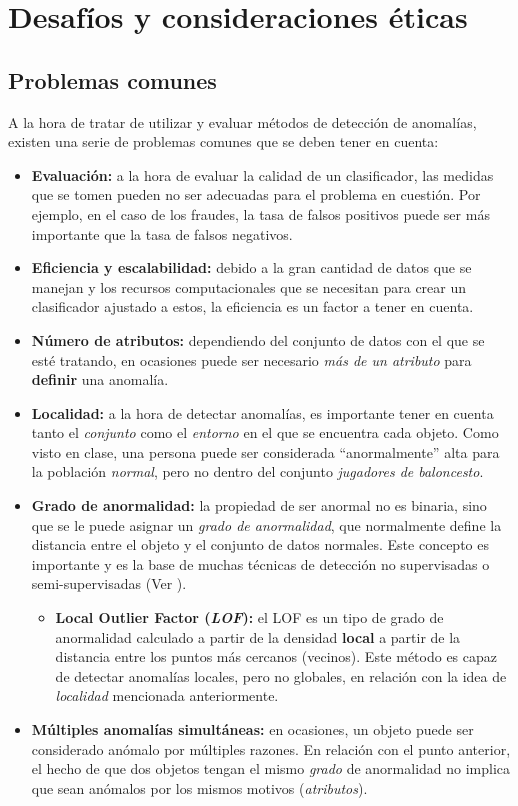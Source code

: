 \chapter{Desafíos y consideraciones éticas}
\section{Problemas comunes}\label{sec:issues}
A la hora de tratar de utilizar y evaluar métodos de detección de anomalías, existen una
serie de problemas comunes que se deben tener en cuenta:

\begin{itemize}[topsep=0pt]
	\item \textbf{Evaluación:} a la hora de evaluar la calidad de un clasificador, las medidas que se tomen
		pueden no ser adecuadas para el problema en cuestión. Por ejemplo, en el caso de los fraudes,
		la tasa de falsos positivos puede ser más importante que la tasa de falsos negativos.
	\item \textbf{Eficiencia y escalabilidad:} debido a la gran cantidad de datos que se manejan y los
		recursos computacionales que se necesitan para crear un clasificador ajustado a estos, la eficiencia
		es un factor a tener en cuenta.
	\item \textbf{Número de atributos:} dependiendo del conjunto de datos con el que se esté tratando, en
		ocasiones puede ser necesario \emph{más de un atributo} para \textbf{definir} una anomalía.
	\item \textbf{Localidad:} a la hora de detectar anomalías, es importante tener en cuenta tanto el
		\emph{conjunto} como el \emph{entorno} en el que se encuentra cada objeto. Como visto en clase,
		una persona puede ser considerada ``anormalmente'' alta para la población \textit{normal},
		pero no dentro del conjunto \textit{jugadores de baloncesto}.
	\item \textbf{Grado de anormalidad:} la propiedad de ser anormal no es binaria, sino que se le puede
		asignar un \emph{grado de anormalidad}, que normalmente define la distancia entre el objeto y el
		conjunto de datos normales. Este concepto es importante y es la base de muchas técnicas de detección
		no supervisadas o semi-supervisadas (Ver ).
		\begin{itemize}
			\item \textbf{Local Outlier Factor (\emph{LOF}):} el LOF es un tipo de grado de anormalidad
				calculado a partir de la densidad \textbf{local} a partir de la distancia entre los puntos
				más cercanos (vecinos). Este método es capaz de detectar anomalías locales, pero no globales,
				en relación con la idea de \textit{localidad} mencionada anteriormente.
		\end{itemize}
	\item \textbf{Múltiples anomalías simultáneas:} en ocasiones, un objeto puede ser considerado anómalo
		por múltiples razones. En relación con el punto anterior, el hecho de que dos objetos tengan el mismo
		\textit{grado} de anormalidad no implica que sean anómalos por los mismos motivos (\textit{atributos}).
\end{itemize}
